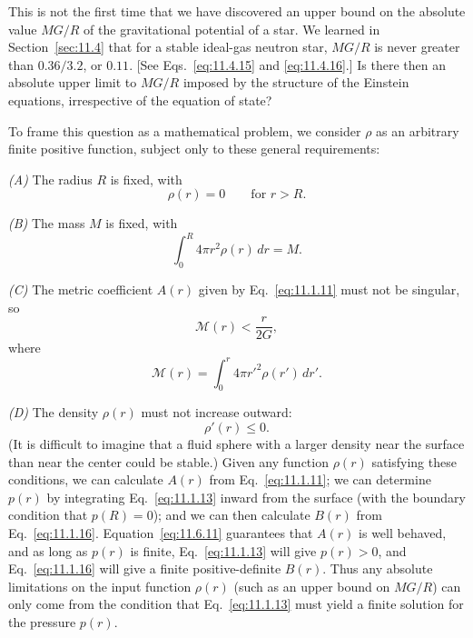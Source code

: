 This is not the first time that we have discovered an upper bound on the
absolute value \(MG/R\) of the gravitational potential of a star. We learned
in Section~\ref{sec:11.4} that for a stable ideal-gas neutron star, \(MG/R\)
is never greater than \(0.36/3.2\), or \(0.11\). [See
Eqs.~\eqref{eq:11.4.15} and \eqref{eq:11.4.16}.] Is there then an absolute
upper limit to \(MG/R\) imposed by the structure of the Einstein equations,
irrespective of the equation of state?

To frame this question as a mathematical problem, we consider \(\rho\) as an
arbitrary finite positive function, subject only to these general
requirements:

\emph{(A)} The radius \(R\) is fixed, with
\begin{equation}
  \rho(r)=0\qquad\text{for }r>R.
  \tag{11.6.9}\label{eq:11.6.9}
\end{equation}

\emph{(B)} The mass \(M\) is fixed, with
\begin{equation}
  \int_0^R4\pi r^2\rho(r)\,dr=M.
  \tag{11.6.10}\label{eq:11.6.10}
\end{equation}

\emph{(C)} The metric coefficient \(A(r)\) given by
Eq.~\eqref{eq:11.1.11} must not be singular, so
\begin{equation}
  \mathcal{M}(r)<\frac r{2G},
  \tag{11.6.11}\label{eq:11.6.11}
\end{equation}
where
\[
  \mathcal{M}(r)=\int_0^r4\pi r'^2\rho(r')\,dr'.
\]

\emph{(D)} The density \(\rho(r)\) must not increase outward:
\begin{equation}
  \rho'(r)\le0.
  \tag{11.6.12}\label{eq:11.6.12}
\end{equation}
(It is difficult to imagine that a fluid sphere with a larger density near the
surface than near the center could be stable.) Given any function \(\rho(r)\)
satisfying these conditions, we can calculate \(A(r)\) from
Eq.~\eqref{eq:11.1.11}; we can determine \(p(r)\) by integrating
Eq.~\eqref{eq:11.1.13} inward from the surface (with the boundary condition
that \(p(R)=0\)); and we can then calculate \(B(r)\) from
Eq.~\eqref{eq:11.1.16}. Equation~\eqref{eq:11.6.11} guarantees that \(A(r)\)
is well behaved, and as long as \(p(r)\) is finite,
Eq.~\eqref{eq:11.1.13} will give \(p(r)>0\), and
Eq.~\eqref{eq:11.1.16} will give a finite positive-definite \(B(r)\). Thus
any absolute limitations on the input function \(\rho(r)\) (such as an upper
bound on \(MG/R\)) can only come from the condition that
Eq.~\eqref{eq:11.1.13} must yield a finite solution for the pressure \(p(r)\).

